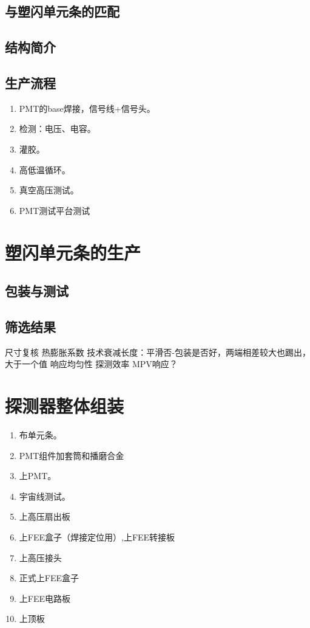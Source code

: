 \subsection{与塑闪单元条的匹配}
\subsection{结构简介}
\subsection{生产流程}
\begin{enumerate}
	\item PMT的base焊接，信号线+信号头。
	\item 检测：电压、电容。
	\item 灌胶。
	\item 高低温循环。
	\item 真空高压测试。
	\item PMT测试平台测试
\end{enumerate}

\section{塑闪单元条的生产}
\subsection{包装与测试}

\subsection{筛选结果}
尺寸复核
热膨胀系数
技术衰减长度：平滑否-包装是否好，两端相差较大也踢出，大于一个值
响应均匀性
探测效率
MPV响应？

\section{探测器整体组装}
\label{sec:construction:psd_assembly}
\begin{enumerate}
	\item 布单元条。
	\item PMT组件加套筒和播磨合金
	\item 上PMT。
	\item 宇宙线测试。
	\item 上高压扇出板
	\item 上FEE盒子（焊接定位用）,上FEE转接板
	\item 上高压接头
	\item 正式上FEE盒子
	\item 上FEE电路板
	\item 上顶板
\end{enumerate}
